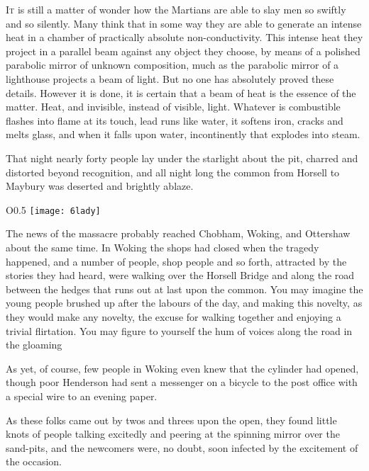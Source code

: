 


\lettrine[lines=4,findent=2pt]{I}{t} is still a matter of wonder how the Martians are able to slay men so swiftly and so silently. Many think that in some way they are able to generate an intense heat in a chamber of practically absolute non-conductivity. This intense heat they project in a parallel beam against any object they choose, by means of a polished parabolic mirror of unknown composition, much as the parabolic mirror of a lighthouse projects a beam of light. But no one has absolutely proved these details. However it is done, it is certain that a beam of heat is the essence of the matter. Heat, and invisible, instead of visible, light. Whatever is combustible flashes into flame at its touch, lead runs like water, it softens iron, cracks and melts glass, and when it falls upon water, incontinently that explodes into steam.

That night nearly forty people lay under the starlight about the pit, charred and distorted beyond recognition, and all night long the common from Horsell to Maybury was deserted and brightly ablaze.

\begin{wrapfigure}{O}{0.5\textwidth}
\centering
\texttt{[image: 6lady]}
\end{wrapfigure}

The news of the massacre probably reached Chobham, Woking, and Ottershaw about the same time. In Woking the shops had closed when the tragedy happened, and a number of people, shop people and so forth, attracted by the stories they had heard, were walking over the Horsell Bridge and along the road between the hedges that runs out at last upon the common. You may imagine the young people brushed up after the labours of the day, and making this novelty, as they would make any novelty, the excuse for walking together and enjoying a trivial flirtation. You may figure to yourself the hum of voices along the road in the gloaming\textellipsis

As yet, of course, few people in Woking even knew that the cylinder had opened, though poor Henderson had sent a messenger on a bicycle to the post office with a special wire to an evening paper.

As these folks came out by twos and threes upon the open, they found little knots of people talking excitedly and peering at the spinning mirror over the sand-pits, and the newcomers were, no doubt, soon infected by the excitement of the occasion.

